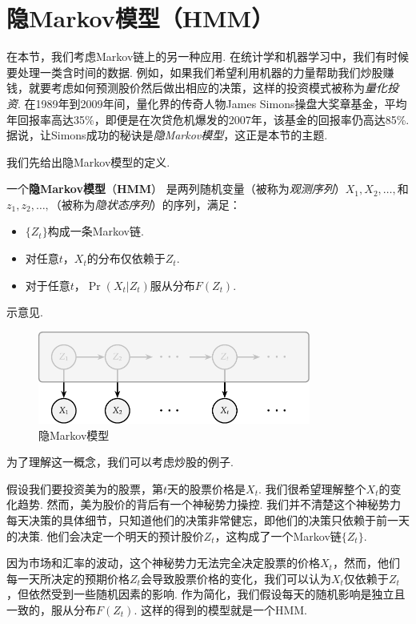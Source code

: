 \section{隐Markov模型（HMM）}\label{sec:HMM}

在本节，我们考虑Markov链上的另一种应用. 在统计学和机器学习中，我们有时候要处理一类含时间的数据. 例如，如果我们希望利用机器的力量帮助我们炒股赚钱，就要考虑如何预测股价然后做出相应的决策，这样的投资模式被称为\emph{量化投资}. 在1989年到2009年间，量化界的传奇人物James Simons操盘大奖章基金，平均年回报率高达35\%，即便是在次贷危机爆发的2007年，该基金的回报率仍高达85\%. 据说，让Simons成功的秘诀是\emph{隐Markov模型}，这正是本节的主题.

我们先给出隐Markov模型的定义. 

\begin{definition}
一个\textbf{隐Markov模型}（\textbf{HMM}） 是两列随机变量（被称为\emph{观测序列}）$X_1,X_2,\dots,$和$z_1,z_2,\dots,$（被称为\emph{隐状态序列}）的序列，满足：
    \begin{itemize}
        \item $\{Z_t\}$构成一条Markov链.
        \item 对任意$t$，$X_t$的分布仅依赖于$Z_t$.
        \item 对于任意$t$，$\Pr(X_t|Z_t)$服从分布$F(Z_t)$.
    \end{itemize}
\end{definition}
示意见.
\begin{figure}[ht]
    \centering
    \includegraphics[width=0.8\textwidth]{figures/Markov-chain/HMM.pdf}
    \caption{隐Markov模型}
    \label{fig:HMM}
\end{figure}    

为了理解这一概念，我们可以考虑炒股的例子. 
\begin{example}[美为HMM]\label{ex:meiwei-HMM}
假设我们要投资美为的股票，第$t$天的股票价格是$X_t$. 我们很希望理解整个$X_t$的变化趋势. 然而，美为股价的背后有一个神秘势力操控. 我们并不清楚这个神秘势力每天决策的具体细节，只知道他们的决策非常健忘，即他们的决策只依赖于前一天的决策. 他们会决定一个明天的预计股价$Z_t$，这构成了一个Markov链$\{Z_t\}$. 

因为市场和汇率的波动，这个神秘势力无法完全决定股票的价格$X_t$，然而，他们每一天所决定的预期价格$Z_t$会导致股票价格的变化，我们可以认为$X_t$仅依赖于$Z_t$，但依然受到一些随机因素的影响. 作为简化，我们假设每天的随机影响是独立且一致的，服从分布$F(Z_t)$. 这样的得到的模型就是一个HMM.
\end{example}

